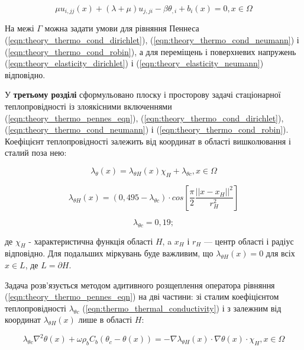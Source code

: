 \begin{equation}
    \label{eqn:theory_thermoelasticity_displacement_eqn}
    \mu u_{i,jj}(x) + (\lambda + \mu)u_{j,ji} - \beta \theta_{,i} + b_i(x) = 0, x \in \Omega
\end{equation}

На межі $\Gamma$ можна задати умови для рівняння Пеннеса (\ref{eqn:theory_thermo_cond_dirichlet}), 
(\ref{eqn:theory_thermo_cond_neumann}) і (\ref{eqn:theory_thermo_cond_robin}), а для переміщень і поверхневих напружень 
(\ref{eqn:theory_elasticity_dirichlet}) і (\ref{eqn:theory_elasticity_neumann}) відповідно.

У \textbf{третьому розділі} сформульовано плоску і просторову задачі стаціонарної теплопровідності із злоякісними 
включеннями (\ref{eqn:theory_thermo_pennes_eqn}), (\ref{eqn:theory_thermo_cond_dirichlet}), 
(\ref{eqn:theory_thermo_cond_neumann}) і (\ref{eqn:theory_thermo_cond_robin}). Коефіцієнт теплопровідності залежить від 
координат в області вишколювання і сталий поза нею:

\begin{equation}
  \label{eqn:thermo_thermal_conductivity}
  \lambda_\theta(x) = \lambda_{\theta H}(x)\chi_H + \lambda_{\theta c}, x \in \Omega
\end{equation}

\begin{equation*}
  \lambda_{\theta H}(x) = (0,495 - \lambda_{\theta c}) \cdot cos\left[\frac{\pi}{2}\frac{||x-x_H||^2}{r_H^2}\right]
\end{equation*}

\begin{equation*}
  \lambda_{\theta c} = 0,19;
\end{equation*}

\noindent де $\chi_H$ - характеристична функція області $H$, a $x_H$ і $r_H$ --- центр області і радіус відповідно. 
Для подальших міркувань буде важливим, що $\lambda_{\theta H}(x) = 0$ для всіх $x \in L$, де $L = \partial H$.

Задача розв'язується методом адитивного розщеплення оператора рівняння (\ref{eqn:theory_thermo_pennes_eqn}) на дві
частини: зі сталим коефіцієнтом теплопровідності $\lambda_{\theta c}$ (\ref{eqn:thermo_thermal_conductivity}) і з
залежним від координат $\lambda_{\theta H}(x)$ лише в області $H$:

\begin{equation}
  \label{eqn:thermo_pennes_separation_eqn}
  \lambda_{\theta c} \nabla^2 \theta(x) + \omega \rho_b C_b (\theta_c - \theta(x)) = 
    - \nabla \lambda_{\theta H} (x) \cdot \nabla \theta(x) \cdot \chi_H, x \in \Omega
\end{equation}


